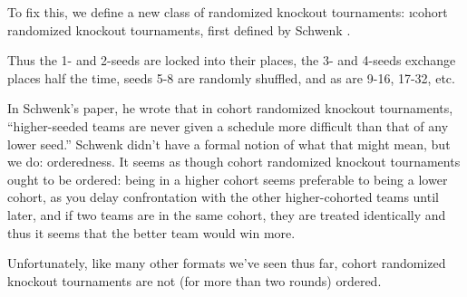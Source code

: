 {    
    
    To fix this, we define a new class of randomized knockout tournaments: \i{cohort randomized knockout tournaments}, first defined by Schwenk \cite{randomized_cohort}.
    

    Thus the 1- and 2-seeds are locked into their places, the 3- and 4-seeds exchange places half the time, seeds 5-8 are randomly shuffled, and as are 9-16, 17-32, etc. 
    

    In Schwenk's paper, he wrote that in cohort randomized knockout tournaments, ``higher-seeded teams are never given a schedule more difficult than that of any lower seed.'' Schwenk didn't have a formal notion of what that might mean, but we do: orderedness. It seems as though cohort randomized knockout tournaments ought to be ordered: being in a higher cohort seems preferable to being a lower cohort, as you delay confrontation with the other higher-cohorted teams until later, and if two teams are in the same cohort, they are treated identically and thus it seems that the better team would win more.

    Unfortunately, like many other formats we've seen thus far, cohort randomized knockout tournaments are not (for more than two rounds) ordered.


}
